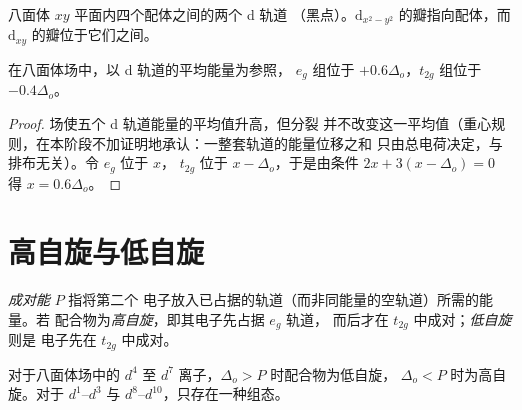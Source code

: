 \begin{omfigure}

{\small 八面体 $xy$ 平面内四个配体之间的两个 d 轨道
（黑点）。$\mathrm d_{x^2-y^2}$ 的瓣指向配体，而
$\mathrm d_{xy}$ 的瓣位于它们之间。}
\end{omfigure}

\begin{theorem}[重心]\label{thm:b2:ligand-field:barycentre}
在八面体场中，以 d 轨道的平均能量为参照，
$e_g$ 组位于 $+0.6\Delta_o$，$t_{2g}$ 组位于 $-0.4\Delta_o$。
\end{theorem}

\begin{proof}
场使五个 d 轨道能量的平均值升高，但分裂
并不改变这一平均值（重心规则，在本阶段不加证明地承认：一整套轨道的能量位移之和
只由总电荷决定，与排布无关）。令 $e_g$ 位于 $x$，
$t_{2g}$ 位于 $x - \Delta_o$，于是由条件 $2x + 3(x - \Delta_o) = 0$ 得 $x = 0.6\Delta_o$。
\end{proof}

\section{高自旋与低自旋}

\begin{definition}[自旋态]\label{def:b2:ligand-field:spin}
\emph{成对能} $P$ 指将第二个
电子放入已占据的轨道（而非同能量的空轨道）所需的能量。若
配合物为\emph{高自旋}，即其电子先占据 $e_g$ 轨道，
而后才在 $t_{2g}$ 中成对；\emph{低自旋}则是
电子先在 $t_{2g}$ 中成对。
\end{definition}

\begin{proposition}[自旋态的选择]\label{prop:b2:ligand-field:spin-state}
对于八面体场中的 $d^4$ 至 $d^7$ 离子，$\Delta_o > P$ 时配合物为低自旋，
$\Delta_o < P$ 时为高自旋。对于 $d^1$--$d^3$ 与 $d^8$--$d^{10}$，只存在一种组态。
\end{proposition}

